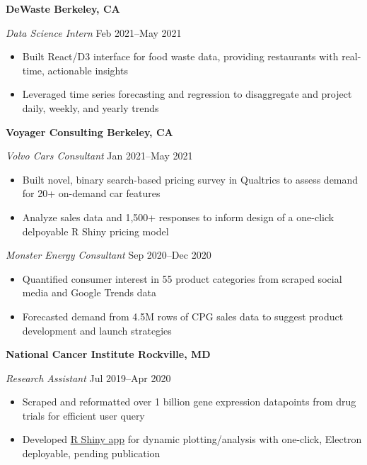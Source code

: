 \documentclass[11pt]{article}
\begin{document}
\textbf{DeWaste \hfill Berkeley, CA}\par

\textit{Data Science Intern} \hfill Feb 2021--May 2021
\begin{itemize}
	\item Built React/D3 interface for food waste data, providing restaurants with real-time, actionable insights
	\item Leveraged time series forecasting and regression to disaggregate and project daily, weekly, and yearly trends
\end{itemize}\par

\textbf{Voyager Consulting \hfill Berkeley, CA}\par

\textit{Volvo Cars Consultant} \hfill Jan 2021--May 2021
\begin{itemize}
	\item Built novel, binary search-based pricing survey in Qualtrics to assess demand for 20+ on-demand car features
	\item Analyze sales data and 1,500+ responses to inform design of a one-click delpoyable R Shiny pricing model
\end{itemize}\par

\textit{Monster Energy Consultant} \hfill Sep 2020--Dec 2020
\begin{itemize}
	\item Quantified consumer interest in 55 product categories from scraped social media and Google Trends data
	\item Forecasted demand from 4.5M rows of CPG sales data to suggest product development and launch strategies
\end{itemize}\par

\textbf{National Cancer Institute \hfill Rockville, MD}\par

\textit{Research Assistant} \hfill Jul 2019--Apr 2020 \par
\begin{itemize}
	\item Scraped and reformatted over 1 billion gene expression datapoints from drug trials for efficient user query
	\item Developed \href{https://github.com/petezh/TP-Workbench}{R Shiny app} for dynamic plotting/analysis with one-click, Electron deployable, pending publication
\end{itemize}\vspace{0.1cm}
\end{document}
